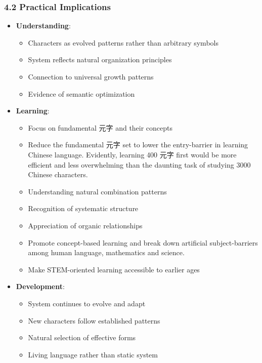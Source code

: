 \documentclass[
  11pt,
  letterpaper,
]{article}
\providecommand{\tightlist}{%
  \setlength{\itemsep}{0pt}\setlength{\parskip}{0pt}}
\begin{document}
\subsubsection{4.2 Practical Implications}\label{practical-implications}

\begin{itemize}
\tightlist
\item
  \textbf{Understanding}:

  \begin{itemize}
  \tightlist
  \item
    Characters as evolved patterns rather than arbitrary symbols
  \item
    System reflects natural organization principles
  \item
    Connection to universal growth patterns
  \item
    Evidence of semantic optimization
  \end{itemize}
\item
  \textbf{Learning}:

  \begin{itemize}
  \tightlist
  \item
    Focus on fundamental 元字 and their concepts
  \item
    Reduce the fundamental 元字 set to lower the entry-barrier in
    learning Chinese language. Evidently, learning 400 元字 first would
    be more efficient and less overwhelming than the daunting task of
    studying 3000 Chinese characters.
  \item
    Understanding natural combination patterns
  \item
    Recognition of systematic structure
  \item
    Appreciation of organic relationships
  \item
    Promote concept-based learning and break down artificial
    subject-barriers among human language, mathematics and science.
  \item
    Make STEM-oriented learning accessible to earlier ages
  \end{itemize}
\item
  \textbf{Development}:

  \begin{itemize}
  \tightlist
  \item
    System continues to evolve and adapt
  \item
    New characters follow established patterns
  \item
    Natural selection of effective forms
  \item
    Living language rather than static system
  \end{itemize}
\end{itemize}
\end{document}
